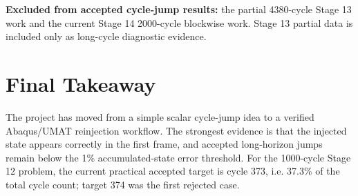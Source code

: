 \documentclass[11pt,a4paper]{article}
\begin{document}
\textbf{Excluded from accepted cycle-jump results:} the partial 4380-cycle Stage 13 work and the current Stage 14 2000-cycle blockwise work. Stage 13 partial data is included only as long-cycle diagnostic evidence.

\section{Final Takeaway}

The project has moved from a simple scalar cycle-jump idea to a verified Abaqus/UMAT reinjection workflow. The strongest evidence is that the injected state appears correctly in the first frame, and accepted long-horizon jumps remain below the 1\% accumulated-state error threshold. For the 1000-cycle Stage 12 problem, the current practical accepted target is cycle 373, i.e. 37.3\% of the total cycle count; target 374 was the first rejected case.
\end{document}
